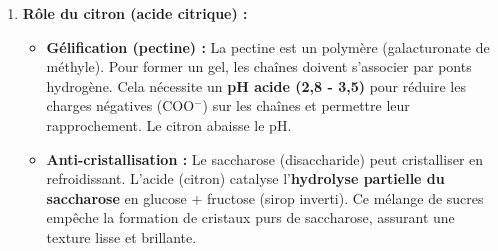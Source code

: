\documentclass[11pt]{article}
\begin{document}
\begin{exoresolu}
\begin{enumerate}
\begin{itemize}
    \end{itemize}
    \item \textbf{Rôle du citron (acide citrique) :}
    \begin{itemize}
        \item \textbf{Gélification (pectine) :} La pectine est un polymère (galacturonate de méthyle). Pour former un gel, les chaînes doivent s'associer par ponts hydrogène. Cela nécessite un \textbf{pH acide (2,8 - 3,5)} pour réduire les charges négatives (COO$^-$) sur les chaînes et permettre leur rapprochement. Le citron abaisse le pH.
        \item \textbf{Anti-cristallisation :} Le saccharose (disaccharide) peut cristalliser en refroidissant. L'acide (citron) catalyse l'\textbf{hydrolyse partielle du saccharose} en glucose + fructose (sirop inverti). Ce mélange de sucres empêche la formation de cristaux purs de saccharose, assurant une texture lisse et brillante.
    \end{itemize}
\end{enumerate}
\end{exoresolu}
\end{document}
